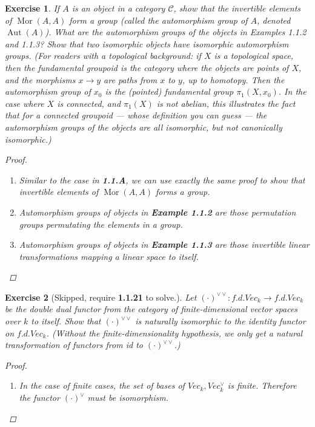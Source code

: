 \documentclass{article}
\theoremstyle{breakstyle}
\newtheorem{exercise}{Exercise}[section]
\DeclareMathOperator{\mor}{Mor}
\begin{document}
\begin{exercise}
If $A$ is an object in a category $\mathcal{C}$, show that the invertible
elements of $\mor(A,A)$ form a group (called the automorphism group of $A$,
denoted $\operatorname{Aut}(A)$). What are the automorphism groups of the
objects in Examples 1.1.2 and 1.1.3? Show that two isomorphic objects have
isomorphic automorphism groups. (For readers with a topological background:
if $X$ is a topological space, then the fundamental groupoid is the category
where the objects are points of $X$, and the morphisms $x\to y$ are paths
from $x$ to $y$, up to homotopy. Then the automorphism group of $x_{0}$ is
the (pointed) fundamental group $\pi_{1}(X,x_{0})$. In the case where $X$ is
connected, and $\pi_{1}(X)$ is not abelian, this illustrates the fact that
for a connected groupoid --- whose definition you can guess --- the
automorphism groups of the objects are all isomorphic, but not canonically
isomorphic.)

\begin{proof}
		\begin{enumerate}
            \item Similar to the case in \textbf{1.1.A}, we can use exactly the
                same proof to show that invertible elements of
                $\mor(A,A)$ forms a group.
            \item Automorphism groups of objects in \textbf{Example 1.1.2} are
                those permutation groups permutating the elements in a group.
            \item Automorphism groups of objects in \textbf{Example 1.1.3} are
                those invertible linear transformations mapping a linear space
                to itself.
		\end{enumerate}
\end{proof}

\end{exercise}

\begin{exercise}[Skipped, require \textbf{1.1.21} to solve.]
Let $(\cdot)^{\vee\vee}:f.d.Vec_{k}\to f.d.Vec_{k}$ be the double dual
functor from the category of finite-dimensional vector spaces over $k$ to
itself. Show that $(\cdot)^{\vee\vee}$ is naturally isomorphic to the
identity functor on $f.d.Vec_{k}$. (Without the finite-dimensionality
hypothesis, we only get a natural transformation of functors from id to
$(\cdot)^{\vee\vee}$.)

\begin{proof}
    \begin{enumerate}[label=({\roman*})]
        \item In the case of finite cases, the set of bases of
            $Vec_{k},Vec_{k}^{\vee}$ is finite. Therefore the functor
            $(\cdot)^{\vee}$ must be isomorphism.
	\end{enumerate}
\end{proof}

\end{exercise}
\end{document}

